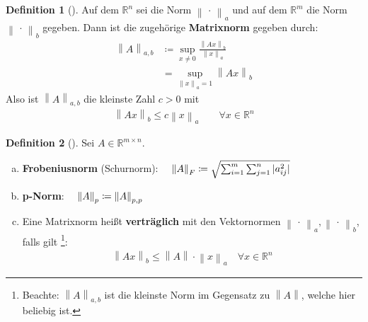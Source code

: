 \documentclass[ngerman,fontsize=11pt, paper=a4, parskip=half, titlepage=true, toc=bib]{scrbook}
\theoremstyle{definition}
\newtheorem{Def}{Definition}[section]		%
\theoremstyle{plain}
\newcommand{\R}{\mathds{R}}
\newcommand{\nn}[1]{\left\| #1 \right\|}
\newcommand{\subsectione}[1]{\subsection{#1} \addtocounter{Def}{1}}
\newenvironment{Defe}[1][]{ %
	\begin{Def}[#1]
	}
	{
	\end{Def}
	\addtocounter{subsection}{1}
}
\begin{document}
  \begin{Defe}
  	\label{3.2.4}
  	Auf dem $\R^n$  sei die Norm $\nn{\,\cdot\,}_a$ und auf dem $\R^m$ die Norm $\nn{\,\cdot\,}_b$ gegeben.
  	Dann ist die zugehörige \textbf{Matrixnorm}  gegeben durch:
  	\begin{align}
  	\nn{A}_{a,b} &\coloneqq \sup_{x\neq 0} \frac{\nn{Ax}_b}{\nn{x}_a} \\ \nonumber
  	&= \sup_{\nn{x}_a=1} \nn{Ax}_b \label{III.2.1} 
  	\end{align}
  	Also ist   $\nn{A}_{a,b}$ die kleinste Zahl $c>0$ mit
  	\begin{gather*}
  	\nn{Ax}_b  \leq c\nn{x}_a \quad\quad \forall x\in \R^n
  	\end{gather*}
  \end{Defe}

\begin{Defe}
	\label{3.2.5}
	Sei $A\in \R^{m\times n}$.
	\begin{enumerate}[a)]
		\item \textbf{Frobeniusnorm} (Schurnorm):
		$ \quad \nn{A}_F \coloneqq \sqrt{\sum_{i=1}^{m}\sum_{j=1}^{n}|a_{ij}^2|}
		\index{Norm!Frobeniusnorm}$
		\item \textbf{p-Norm}: 
		$\quad \nn{A}_p \coloneqq \nn{A}_{p,p}
		\index{p-Norm}$
		\item Eine Matrixnorm heißt \textbf{verträglich}  mit den Vektornormen 
		$\nn{\,\cdot\,}_a, \nn{\,\cdot\,}_b$, falls gilt
		\footnote{ Beachte: $\nn{A}_{a,b}$ ist die kleinste Norm im Gegensatz zu $\nn{A}$, welche hier beliebig ist.}:
		\begin{gather*}
		\nn{Ax}_b \leq \nn{A}\cdot \nn{x}_a \quad \forall x\in \R^n
		\end{gather*}
	\end{enumerate}
\end{Defe}
\end{document}

